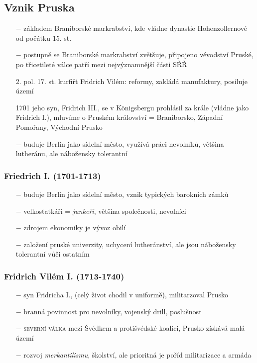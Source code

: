 \documentclass{article}
\begin{document}
\subsection*{Vznik Pruska}
\begin{itemize}
    \vspace{-0.5em}
    \setlength\itemsep{0.15em}
    \item[$-$] základem Braniborské markrabství, kde vládne dynastie Hohenzollernové od počátku 15. st.
    \item[$-$] postupně se Braniborské markrabství zvětšuje, připojeno vévodství Pruské, po třicetileté válce patří mezi nejvýznamnější části SŘŘ
    \item[2. pol. 17. st.] kurfiřt Fridrich Vilém: reformy, zakládá manufaktury, posiluje území
    \item[1701] jeho syn, Fridrich III., se v Königsbergu prohlásil za krále (vládne jako Fridrich I.), mluvíme o Pruském království = Braniborsko, Západní Pomořany, Východní Prusko
    \item[$-$] buduje Berlín jako sídelní město, využívá práci nevolníků, většina lutheránu, ale nábožensky tolerantní
\end{itemize}

\subsubsection*{Friedrich I. (1701-1713)}
\begin{itemize}
    \vspace{-0.5em}
    \setlength\itemsep{0.15em}
    \item[$-$] buduje Berlín jako sídelní město, vznik typických barokních zámků
    \item[$-$] velkostatkáři = \textit{junkeři}, většina společnosti, nevolníci
    \item[$-$] zdrojem ekonomiky je vývoz obilí
    \item[$-$] založení pruské univerzity, uchycení lutheránství, ale jsou nábožensky tolerantní vůči ostatním
\end{itemize}

\subsubsection*{Fridrich Vilém I. (1713-1740)}
\begin{itemize}
    \vspace{-0.5em}
    \setlength\itemsep{0.15em}
    \item[$-$] syn Fridricha I.,  (celý život chodil v uniformě), militarzoval Prusko
    \item[$-$] branná povinnost pro nevolníky, vojenský drill, poslušnost
    \item[$-$] \textsc{severní válka} mezi Švédkem a protišvédské koalici, Prusko získává malá území
    \item[$-$] rozvoj \textit{merkantilismu}, školství, ale prioritná je poříd militarizace a armáda
\end{itemize}
\end{document}
